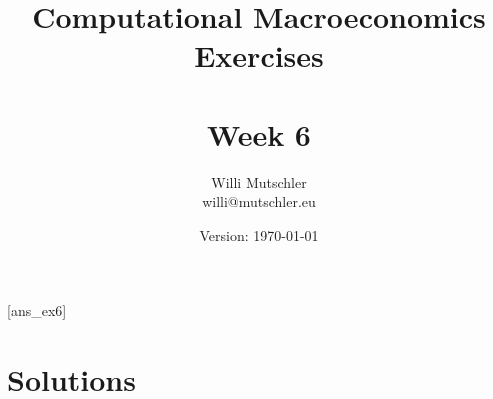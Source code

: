 
\newif\ifDisplaySolutions\DisplaySolutionstrue


\title{Computational Macroeconomics\\Exercises\\~\\Week 6}
\author{Willi Mutschler\\willi@mutschler.eu}
\date{Version: \today}
\maketitle\thispagestyle{empty}

\newpage
{}[ans_ex6]
\tableofcontents\thispagestyle{empty}\newpage

\setcounter{page}{1}
\newpage
\newpage
\printbibliography
{}
\ifDisplaySolutions
\newpage
\appendix
\section{Solutions}

\fi
